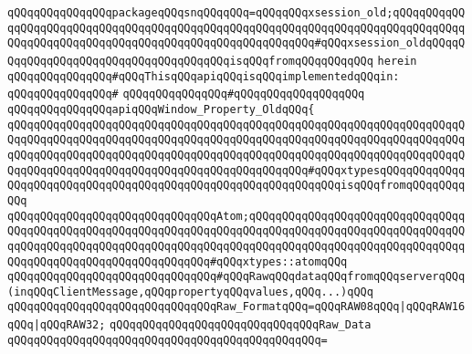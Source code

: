 \verb|qQQqqQQqqQQqqQQqpackageqQQqsnqQQqqQQq=qQQqqQQqxsession_old;qQQqqQQqqQQqqQQqqQQqqQQqqQQqqQQqqQQqqQQqqQQqqQQqqQQqqQQqqQQqqQQqqQQqqQQqqQQqqQQqqQQqqQQqqQQqqQQqqQQqqQQqqQQqqQQqqQQqqQQqqQQqqQQq#qQQqxsession_oldqQQqqQQqqQQqqQQqqQQqqQQqqQQqqQQqqQQqqQQqisqQQqfromqQQqqQQqqQQq|\newline
\verb|herein|\newline
\newline
\verb|qQQqqQQqqQQqqQQq#qQQqThisqQQqapiqQQqisqQQqimplementedqQQqin:|\newline
\verb|qQQqqQQqqQQqqQQq#|\newline
\verb|qQQqqQQqqQQqqQQq#qQQqqQQqqQQqqQQqqQQq|\newline
\newline
\verb|qQQqqQQqqQQqqQQqapiqQQqWindow_Property_OldqQQq{|\newline
\verb|qQQqqQQqqQQqqQQqqQQqqQQqqQQqqQQqqQQqqQQqqQQqqQQqqQQqqQQqqQQqqQQqqQQqqQQqqQQqqQQqqQQqqQQqqQQqqQQqqQQqqQQqqQQqqQQqqQQqqQQqqQQqqQQqqQQqqQQqqQQqqQQqqQQqqQQqqQQqqQQqqQQqqQQqqQQqqQQqqQQqqQQqqQQqqQQqqQQqqQQqqQQqqQQqqQQqqQQqqQQqqQQqqQQqqQQqqQQqqQQqqQQqqQQqqQQqqQQq#qQQqxtypesqQQqqQQqqQQqqQQqqQQqqQQqqQQqqQQqqQQqqQQqqQQqqQQqqQQqqQQqqQQqqQQqisqQQqfromqQQqqQQqqQQq|\newline
\newline
\verb|qQQqqQQqqQQqqQQqqQQqqQQqqQQqqQQqAtom;qQQqqQQqqQQqqQQqqQQqqQQqqQQqqQQqqQQqqQQqqQQqqQQqqQQqqQQqqQQqqQQqqQQqqQQqqQQqqQQqqQQqqQQqqQQqqQQqqQQqqQQqqQQqqQQqqQQqqQQqqQQqqQQqqQQqqQQqqQQqqQQqqQQqqQQqqQQqqQQqqQQqqQQqqQQqqQQqqQQqqQQqqQQqqQQqqQQqqQQqqQQq#qQQqxtypes::atomqQQq|\newline
\newline
\verb|qQQqqQQqqQQqqQQqqQQqqQQqqQQqqQQq#qQQqRawqQQqdataqQQqfromqQQqserverqQQq(inqQQqClientMessage,qQQqpropertyqQQqvalues,qQQq...)qQQq|\newline
\newline
\verb|qQQqqQQqqQQqqQQqqQQqqQQqqQQqqQQqRaw_FormatqQQq=qQQqRAW08qQQq|\verb#|qQQqRAW16qQQq|qQQqRAW32;#\newline
\newline
\verb|qQQqqQQqqQQqqQQqqQQqqQQqqQQqqQQqRaw_Data|\newline
\verb|qQQqqQQqqQQqqQQqqQQqqQQqqQQqqQQqqQQqqQQqqQQqqQQq=|\newline
